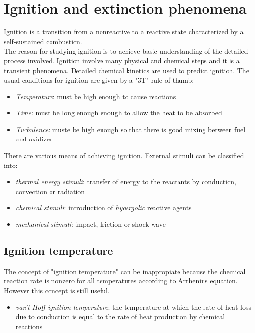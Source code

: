 \documentclass[12pt]{article}
\begin{document}
\newpage

\section{Ignition and extinction phenomena}

Ignition is a transition from a nonreactive to a reactive state characterized by a self-sustained combustion.\\
The reason for studying ignition is to achieve basic understanding of the detailed process involved. Ignition involve many physical and chemical steps and it is a transient phenomena. Detailed chemical kinetics are used to predict ignition. The usual conditions for ignition are given by a "3T" rule of thumb:

\begin{itemize}
    \item \textit{Temperature}: must be high enough to cause reactions
    \item \textit{Time}: must be long enough enough to allow the heat to be absorbed
    \item \textit{Turbulence}: muste be high enough so that there is good mixing between fuel and oxidizer
\end{itemize}

There are various means of achieving ignition. External stimuli can be classified into:

\begin{itemize}
    \item \textit{thermal energy stimuli}: transfer of energy to the reactants by conduction, convection or radiation
    \item \textit{chemical stimuli}: introduction of \textit{hyoergolic} reactive agents
    \item \textit{mechanical stimuli}: impact, friction or shock wave
\end{itemize}

\subsection{Ignition temperature}

The concept of "ignition temperature" can be inappropiate because the chemical reaction rate is nonzero for all temperatures according to Arrhenius equation. However this concept is still useful.

\begin{itemize}
    \item \textit{van't Hoff ignition temperature}: the temperature at which the rate of heat loss due to conduction is equal to the rate of heat production by chemical reactions
\end{itemize}
\end{document}
